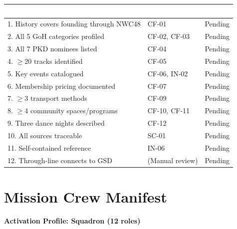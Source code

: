 \documentclass[11pt,letterpaper]{article}
\newcommand{\tableheader}[1]{\textbf{\sffamily\textcolor{white}{#1}}}
\begin{document}
\begin{center}
\begin{tabularx}{\textwidth}{XL{3cm}C{1.5cm}}
\toprule
{}
\tableheader{Success Criterion} & \tableheader{Test ID(s)} & \tableheader{Status} \\
. History covers founding through NWC48 & CF-01 & Pending \\
2. All 5 GoH categories profiled & CF-02, CF-03 & Pending \\
3. All 7 PKD nominees listed & CF-04 & Pending \\
4. $\geq$20 tracks identified & CF-05 & Pending \\
5. Key events catalogued & CF-06, IN-02 & Pending \\
6. Membership pricing documented & CF-07 & Pending \\
7. $\geq$3 transport methods & CF-09 & Pending \\
8. $\geq$4 community spaces/programs & CF-10, CF-11 & Pending \\
9. Three dance nights described & CF-12 & Pending \\
10. All sources traceable & SC-01 & Pending \\
11. Self-contained reference & IN-06 & Pending \\
12. Through-line connects to GSD & (Manual review) & Pending \\
\bottomrule
\end{tabularx}
\end{center}

\section{Mission Crew Manifest}

\textbf{Activation Profile: Squadron (12 roles)}
\end{document}
